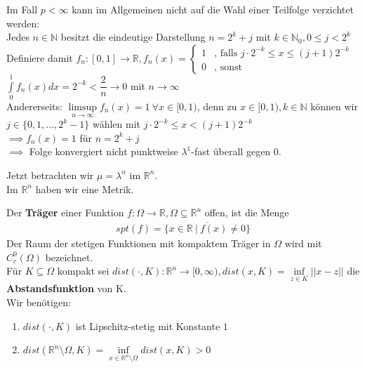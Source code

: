   \begin{example}
    Im Fall $p < \infty$ kann im Allgemeinen nicht auf die Wahl einer Teilfolge verzichtet werden:\\
    Jedes $n \in \mathbb{N}$ besitzt die eindeutige Darstellung $n=2^k+j$ mit $k \in \mathbb{N}_0, 0 \leq j < 2^k$\\
    Definiere damit $f_n:[0,1] \to \mathbb{R}, f_n(x) = \begin{cases}
      1 & \text{, falls } j \cdot 2^{-k} \leq x \leq (j+1) 2^{-k}\\
      0 & \text{, sonst}
    \end{cases}$\\
    $\int\limits_0^1 f_n(x) dx = 2^{-k} < \dfrac{2}{n} \to 0$ mit $n \to \infty$\\
    Andererseits: $\limsup\limits_{n \to \infty} f_n(x) = 1 \ \forall x \in [0,1)$, denn zu $x \in [0,1), k \in \mathbb{N}$ können wir\\
    $j \in \{0,1,...,2^k-1\}$ wählen mit $j \cdot 2^{-k} \leq x < (j+1) 2^{-k}$\\
    $\implies f_n(x) = 1$ für $n = 2^k+j$\\
    $\implies$ Folge konvergiert nicht punktweise $\lambda^1$-fast überall gegen $0$.
  \end{example}

  \begin{remark}
    Jetzt betrachten wir $\mu=\lambda^n$ im $\mathbb{R}^n$.\\
    Im $\mathbb{R}^n$ haben wir eine Metrik.
  \end{remark}

  \begin{definition}
    Der \textbf{Träger} einer Funktion $f:\Omega \to \mathbb{R}, \Omega \subseteq \mathbb{R}^n$ offen, ist die Menge 
    \begin{align*}
      spt(f) = \overline{\{x \in \mathbb{R} \ | \ f(x) \neq 0\}}
    \end{align*}
    Der Raum der stetigen Funktionen mit kompaktem Träger in $\Omega$ wird mit $C_c^0(\Omega)$ bezeichnet.\\
    Für $K \subseteq \Omega$ kompakt sei $dist(\cdot, K): \mathbb{R}^n \to [0, \infty), dist(x, K) = \inf\limits_{z \in K} ||x - z||$ die \textbf{Abstandsfunktion} von K.\\
    Wir benötigen:
    \begin{enumerate}
      \item $dist(\cdot, K)$ ist Lipschitz-stetig mit Konstante $1$
      \item $dist(\mathbb{R}^n \setminus \Omega, K) = \inf\limits_{x \in \mathbb{R}^n \setminus \Omega} dist(x, K) > 0$
    \end{enumerate}
  \end{definition}

